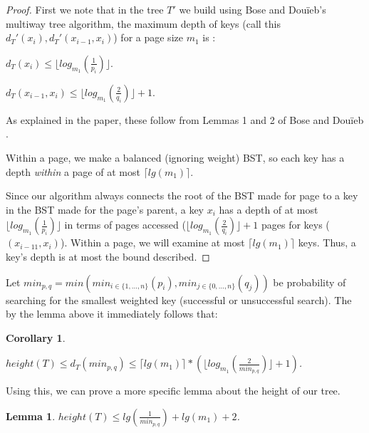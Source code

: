 \documentclass[letterpaper,12pt,titlepage,oneside,final]{book}
\theoremstyle{plain}
\newtheorem{lem}[thm]{Lemma}
\newtheorem*{cor}{Corollary}
\begin{document}
\begin{proof}
First we note that in the tree $T'$ we build using Bose and Dou\"{i}eb's multiway tree algorithm, the maximum depth of keys (call this $d_T'(x_i), d_T'(x_{i-1},x_i)$) for a page size $m_1$ is \cite{bose2009efficient}:
\begin{center} $d_T(x_i) \leq \lfloor log_{m_1}(\frac{1}{p_i}) \rfloor$. \end{center} 
\begin{center} $d_T(x_{i-1},x_i) \leq \lfloor log_{m_1}(\frac{2}{q_i}) \rfloor + 1$. \end{center}
As explained in the paper, these follow from Lemmas 1 and 2 of Bose and Dou\"{i}eb \cite{bose2009efficient}.

Within a page, we make a balanced (ignoring weight) BST, so each key has a depth \textit{within} a page of at most $\lceil lg(m_1) \rceil$.

Since our algorithm always connects the root of the BST made for page to a key in the BST made for the page's parent, a key $x_i$ has a depth of at most $\lfloor log_{m_1}(\frac{1}{p_i}) \rfloor$ in terms of pages accessed ($\lfloor log_{m_1}(\frac{2}{q_i}) \rfloor + 1$ pages for keys ($(x_{i-11},x_i)$). Within a page, we will examine at most $\lceil lg(m_1) \rceil$ keys. Thus, a key's depth is at most the bound described.
\end{proof}

\iffalse

Let $min_{p,q} = min(min_{i \in \{1, ..., n\}}(p_i), min_{j \in \{0, ..., n\}}(q_j))$ be probability of searching for the smallest weighted key (successful or unsuccessful search). The by the lemma above it immediately follows that:
\begin{cor}
\begin{center} $height(T) \leq d_T(min_{p,q}) \leq \lceil lg(m_1) \rceil * (\lfloor log_{m_1}(\frac{2}{min_{p,q}}) \rfloor + 1)$. \end{center}
\end{cor}

Using this, we can prove a more specific lemma about the height of our tree. 

\begin{lem}
 $height(T) \leq lg(\frac{1}{min_{p,q}}) + lg(m_1) + 2$.
\end{lem}
\end{document}
